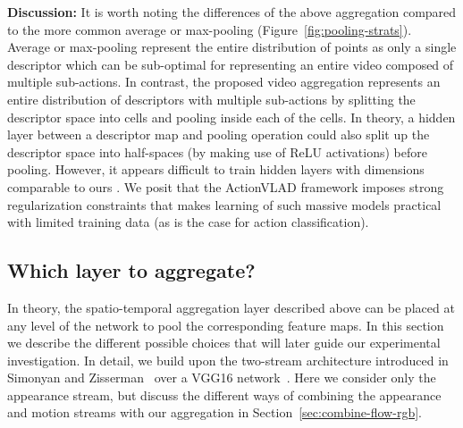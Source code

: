 \documentclass[10pt,twocolumn,letterpaper]{article}
\newcommand{\methodTag}[0]{ActionVLAD}
\begin{document}
{\bf Discussion:} It is worth noting the differences of the above aggregation compared to the more common average or max-pooling (Figure~\ref{fig:pooling-strats}). Average or max-pooling represent the entire distribution of points as only a single descriptor which can be sub-optimal for representing an entire video composed of multiple sub-actions. In contrast, the proposed video aggregation represents an entire distribution of descriptors with multiple sub-actions by splitting the descriptor space into cells and pooling inside each of the cells. In theory, a hidden layer between a descriptor map and pooling operation could also split up the descriptor space into half-spaces (by making use of ReLU activations) before pooling. However, it appears difficult to train hidden layers with dimensions comparable to ours . We posit that the \methodTag{} framework imposes strong regularization constraints that makes learning of such massive models practical with limited training data (as is the case for action classification). 











\subsection{Which layer to aggregate?}\label{sec:pool-where}


In theory, the spatio-temporal aggregation layer described above can be placed at any level of the network to pool the corresponding feature maps. In this section we describe the different possible choices that will later guide our experimental investigation. 
In detail, we build upon the two-stream architecture introduced in
Simonyan and Zisserman~\cite{Simonyan_14b} over a VGG16 network~\cite{Simonyan_14a}. Here we consider only the appearance stream, but discuss the different ways of combining the appearance and motion streams with our aggregation in Section~\ref{sec:combine-flow-rgb}.
\end{document}
